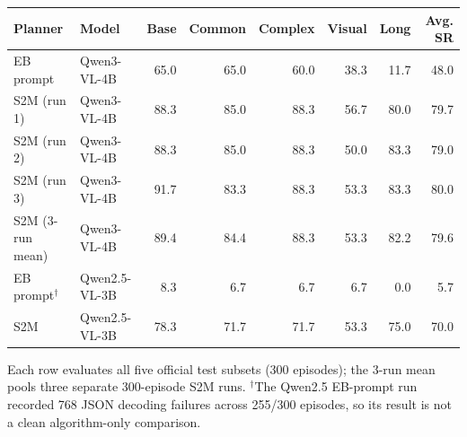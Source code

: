 \begin{tabular}{llrrrrrr}
\toprule
Planner & Model & Base & Common & Complex & Visual & Long & Avg. SR \\
\midrule
EB prompt & Qwen3-VL-4B & 65.0 & 65.0 & 60.0 & 38.3 & 11.7 & 48.0 \\
S2M (run 1) & Qwen3-VL-4B & 88.3 & 85.0 & 88.3 & 56.7 & 80.0 & 79.7 \\
S2M (run 2) & Qwen3-VL-4B & 88.3 & 85.0 & 88.3 & 50.0 & 83.3 & 79.0 \\
S2M (run 3) & Qwen3-VL-4B & 91.7 & 83.3 & 88.3 & 53.3 & 83.3 & 80.0 \\
S2M (3-run mean) & Qwen3-VL-4B & 89.4 & 84.4 & 88.3 & 53.3 & 82.2 & 79.6 \\
\midrule
EB prompt$^\dagger$ & Qwen2.5-VL-3B & 8.3 & 6.7 & 6.7 & 6.7 & 0.0 & 5.7 \\
S2M & Qwen2.5-VL-3B & 78.3 & 71.7 & 71.7 & 53.3 & 75.0 & 70.0 \\
\bottomrule
\end{tabular}

\vspace{0.25em}\footnotesize Each row evaluates all five official test subsets (300 episodes); the 3-run mean pools three
separate 300-episode S2M runs. $^\dagger$The Qwen2.5 EB-prompt run recorded 768 JSON decoding failures across
255/300 episodes, so its result is not a clean algorithm-only comparison.
